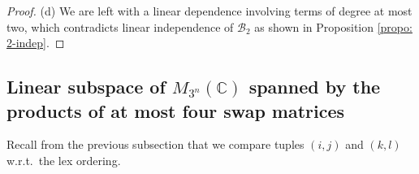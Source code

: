 \documentclass[12pt,dvipsnames,accepted=2016-08-18,a4paper,onecolumn]{quantumarticle}
\numberwithin{equation}{section}
\newcommand{\CC}{\mathbb C}
\theoremstyle{definition}
\begin{document}
\begin{proof}
(d) We are left with a linear dependence involving terms of degree at most two, which contradicts linear independence of $\mathcal{B}_2$ as shown in Proposition \ref{propo: 2-indep}.
\end{proof}
	
	


	
	
	
	
	
\subsection{Linear subspace of  $M_{3^n}(\CC)$ spanned by the products of at most four swap matrices}\label{a:d3l4} Recall from the previous subsection that we compare tuples $(i,j)$ and $(k,l)$ w.r.t.~the lex ordering.
	
\end{document}
